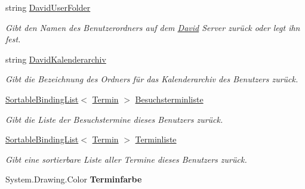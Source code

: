 \begin{DoxyCompactItemize}
\item 
string \hyperlink{class_products_1_1_model_1_1_entities_1_1_user_a95c0af472366c2b414e191193d9e0274}{David\+User\+Folder}
\begin{DoxyCompactList}\small\item\em Gibt den Namen des Benutzerordners auf dem \hyperlink{namespace_david}{David} Server zurück oder legt ihn fest. \end{DoxyCompactList}\item 
string \hyperlink{class_products_1_1_model_1_1_entities_1_1_user_aa40e7b706636f5b09aa2431058efb490}{David\+Kalenderarchiv}
\begin{DoxyCompactList}\small\item\em Gibt die Bezeichnung des Ordners für das Kalenderarchiv des Benutzers zurück. \end{DoxyCompactList}\item 
\hyperlink{class_products_1_1_common_1_1_sortable_binding_list}{Sortable\+Binding\+List}$<$ \hyperlink{class_products_1_1_model_1_1_entities_1_1_termin}{Termin} $>$ \hyperlink{class_products_1_1_model_1_1_entities_1_1_user_afe450a384b5b94c2e5209b7487b5759e}{Besuchsterminliste}
\begin{DoxyCompactList}\small\item\em Gibt die Liste der Besuchstermine dieses Benutzers zurück. \end{DoxyCompactList}\item 
\hyperlink{class_products_1_1_common_1_1_sortable_binding_list}{Sortable\+Binding\+List}$<$ \hyperlink{class_products_1_1_model_1_1_entities_1_1_termin}{Termin} $>$ \hyperlink{class_products_1_1_model_1_1_entities_1_1_user_a4285b5084deca4eb33f9b91900c88aad}{Terminliste}
\begin{DoxyCompactList}\small\item\em Gibt eine sortierbare Liste aller Termine dieses Benutzers zurück. \end{DoxyCompactList}\item 
System.\+Drawing.\+Color {\bfseries Terminfarbe}\hypertarget{class_products_1_1_model_1_1_entities_1_1_user_a9c3c0cb81ad0d4e6d17255a79b4fd7a0}{}\label{class_products_1_1_model_1_1_entities_1_1_user_a9c3c0cb81ad0d4e6d17255a79b4fd7a0}

\end{DoxyCompactItemize}


